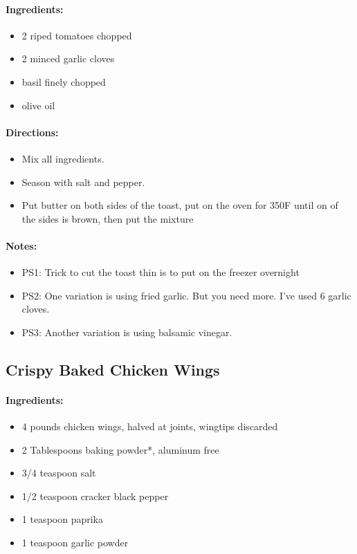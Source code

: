 \documentclass{article}
\begin{document}
\paragraph{Ingredients:}
\begin{itemize}
    \item 2 riped tomatoes chopped
    \item 2 minced garlic cloves
    \item basil finely chopped
    \item olive oil
\end{itemize}

\paragraph{Directions:}
\begin{itemize}
    \item Mix all ingredients.
    \item Season with salt and pepper.
    \item Put butter on both sides of the toast, put on the oven for 350F until on of the sides is brown, then put the mixture
\end{itemize}

\paragraph{Notes:}
\begin{itemize}
    \item PS1: Trick to cut the toast thin is to put on the freezer overnight
    \item PS2: One variation is using fried garlic. But you need more. I've used 6 garlic cloves.
    \item PS3: Another variation is using balsamic vinegar.
\end{itemize}

\subsection{Crispy Baked Chicken Wings}

\paragraph{Ingredients:}
\begin{itemize}
    \item 4 pounds chicken wings, halved at joints, wingtips discarded
    \item 2 Tablespoons baking powder*, aluminum free
    \item 3/4 teaspoon salt
    \item 1/2 teaspoon cracker black pepper
    \item 1 teaspoon paprika
    \item 1 teaspoon garlic powder
\end{itemize}
\end{document}
